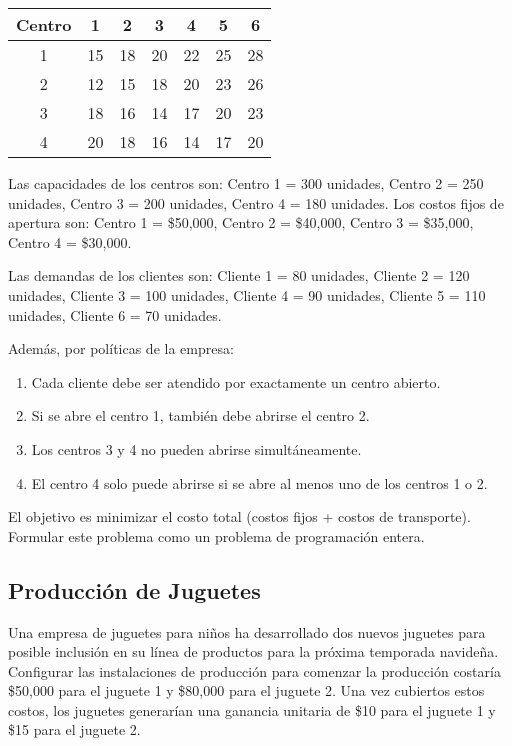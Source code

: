 \documentclass[12pt]{article}
\begin{document}
\begin{table}[h]
\centering
\begin{tabular}{ccccccc}
\toprule
\textbf{Centro} & \textbf{1} & \textbf{2} & \textbf{3} & \textbf{4} & \textbf{5} & \textbf{6} \\
\midrule
1 & 15 & 18 & 20 & 22 & 25 & 28 \\
2 & 12 & 15 & 18 & 20 & 23 & 26 \\
3 & 18 & 16 & 14 & 17 & 20 & 23 \\
4 & 20 & 18 & 16 & 14 & 17 & 20 \\
\bottomrule
\end{tabular}
\end{table}

Las capacidades de los centros son: Centro 1 = 300 unidades, Centro 2 = 250 unidades, Centro 3 = 200 unidades, Centro 4 = 180 unidades. Los costos fijos de apertura son: Centro 1 = \$50,000, Centro 2 = \$40,000, Centro 3 = \$35,000, Centro 4 = \$30,000.

\vspace{0.5em}

Las demandas de los clientes son: Cliente 1 = 80 unidades, Cliente 2 = 120 unidades, Cliente 3 = 100 unidades, Cliente 4 = 90 unidades, Cliente 5 = 110 unidades, Cliente 6 = 70 unidades.

\vspace{0.5em}

Además, por políticas de la empresa:
\begin{enumerate}[label=\arabic*.]
    \item Cada cliente debe ser atendido por exactamente un centro abierto.
    \item Si se abre el centro 1, también debe abrirse el centro 2.
    \item Los centros 3 y 4 no pueden abrirse simultáneamente.
    \item El centro 4 solo puede abrirse si se abre al menos uno de los centros 1 o 2.
\end{enumerate}

El objetivo es minimizar el costo total (costos fijos + costos de transporte). Formular este problema como un problema de programación entera.

\subsection{Producción de Juguetes}
Una empresa de juguetes para niños ha desarrollado dos nuevos juguetes para posible inclusión en su línea de productos para la próxima temporada navideña. Configurar las instalaciones de producción para comenzar la producción costaría \$50,000 para el juguete 1 y \$80,000 para el juguete 2. Una vez cubiertos estos costos, los juguetes generarían una ganancia unitaria de \$10 para el juguete 1 y \$15 para el juguete 2.
\end{document}
